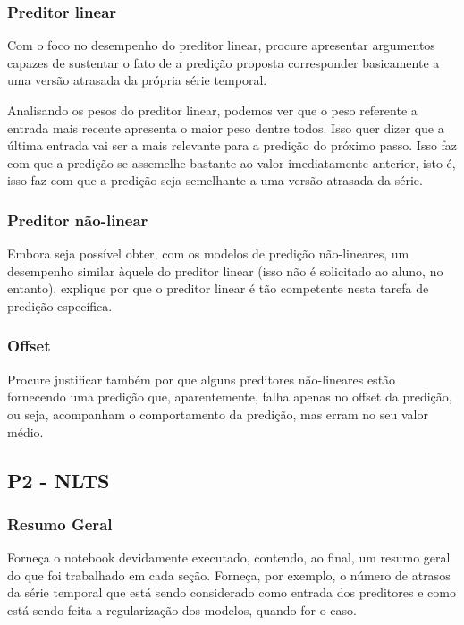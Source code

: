 \documentclass[a4paper]{article}    %
\begin{document}
\subsubsection{Preditor linear}
Com o foco no desempenho do preditor linear, procure apresentar argumentos capazes de sustentar o fato de a predição  proposta corresponder basicamente a uma versão atrasada da própria série temporal.

Analisando os pesos do preditor linear, podemos ver que o peso referente a entrada mais recente apresenta o maior peso dentre todos. Isso quer dizer que a última entrada vai ser a mais relevante para a predição do próximo passo. Isso faz com que a predição se assemelhe bastante ao valor imediatamente anterior, isto é, isso faz com que a predição seja semelhante a uma versão atrasada da série.

\subsubsection{Preditor não-linear}
Embora seja possível obter, com os modelos de predição não-lineares, um desempenho similar àquele do preditor linear (isso não é solicitado ao aluno, no entanto), explique por que o preditor linear é tão competente nesta tarefa de predição específica.

\subsubsection{Offset}
Procure justificar também por que alguns preditores não-lineares estão fornecendo uma predição que, aparentemente, falha apenas no offset da predição, ou seja, acompanham o comportamento da predição, mas erram no seu valor médio.

\subsection{P2 - NLTS}

\subsubsection{Resumo Geral}
Forneça o notebook devidamente executado, contendo, ao final, um resumo geral do que foi trabalhado em cada seção. Forneça, por exemplo, o número de atrasos da série temporal que está sendo considerado como entrada dos preditores e como está sendo feita a regularização dos modelos, quando for o caso.
\end{document}
